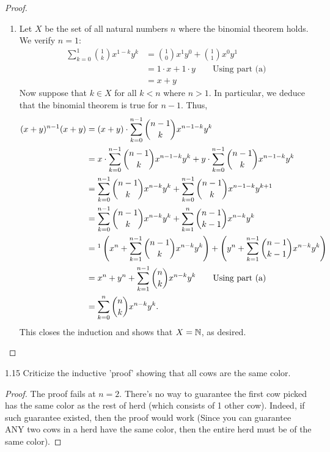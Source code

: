\begin{proof}
\begin{enumerate}[label=(\alph*)]
\item Let \(X\) be the set of all natural numbers \(n\) where the binomial theorem holds.
We verify \(n = 1\):
\begin{align*}
    \sum_{k=0}^{1}\binom{1}{k}x^{1-k}y^k &= \binom{1}{0}x^{1}y^{0} + \binom{1}{1}x^{0}y^{1}\\
    &= 1 \cdot x + 1 \cdot y \qquad \text{Using part (a)} \\
    &= x + y
\end{align*}
Now suppose that \(k \in X\) for all \(k < n\) where \(n > 1\). In particular, we deduce that the binomial theorem is true for \(n-1\).
Thus,
\begin{align*}
    (x+y)^{n-1}(x+y) &= (x+y) \cdot \sum_{k=0}^{n-1}\binom{n-1}{k}x^{n-1-k}y^{k} \\
    &= x\cdot\sum_{k=0}^{n-1}\binom{n-1}{k}x^{n-1-k}y^k + y\cdot\sum_{k=0}^{n-1}\binom{n-1}{k}x^{n-1-k}y^{k} \\
    &= \sum_{k=0}^{n-1}\binom{n-1}{k}x^{n-k}y^{k} + \sum_{k=0}^{n-1}\binom{n-1}{k}x^{n-1-k}y^{k+1}\\
    &= \sum_{k=0}^{n-1}\binom{n-1}{k}x^{n-k}y^{k} + \sum_{k=1}^{n}\binom{n-1}{k-1}x^{n-k}y^{k}\\
    &= \footnotemark\left(x^n + \sum_{k=1}^{n-1}\binom{n-1}{k}x^{n-k}y^k\right) + \left(y^n + \sum_{k=1}^{n-1}\binom{n-1}{k-1}x^{n-k}y^k\right)\\
    &= x^n + y^n + \sum_{k=1}^{n-1}\binom{n}{k}x^{n-k}y^k \qquad \text{Using part (a)}\\
    &= \sum_{k=0}^{n}\binom{n}{k}x^{n-k}y^k.
\end{align*}
This closes the induction and shows that \(X = \mathbb{N}\), as desired.
\end{enumerate}
\end{proof}

\begin{exercise}{1.15}
    Criticize the inductive 'proof' showing that all cows are the same color.
\end{exercise}
\begin{proof}
    The proof fails at \(n = 2\). There's no way to guarantee the first cow picked has the same color as the rest of herd (which consists of 1 other cow).
    Indeed, if such guarantee existed, then the proof would work (Since you can guarantee ANY two cows in a herd have the same color, then the entire herd must be of the same color).
\end{proof}

